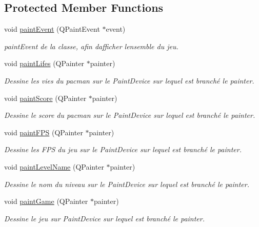 \subsection*{Protected Member Functions}
\begin{DoxyCompactItemize}
\item 
void \hyperlink{class_pacscreen_a2ad3be852db68118d6eb50e979b6e2e9}{paint\+Event} (Q\+Paint\+Event $\ast$event)
\begin{DoxyCompactList}\small\item\em paint\+Event de la classe, afin d\textquotesingle{}afficher l\textquotesingle{}ensemble du jeu. \end{DoxyCompactList}\item 
void \hyperlink{class_pacscreen_aafb0eadb554235b7a777ec9caa61be3d}{paint\+Lifes} (Q\+Painter $\ast$painter)
\begin{DoxyCompactList}\small\item\em Dessine les vies du pacman sur le Paint\+Device sur lequel est branché le painter. \end{DoxyCompactList}\item 
void \hyperlink{class_pacscreen_a458fdc2040c60b27ca03ce936c94358a}{paint\+Score} (Q\+Painter $\ast$painter)
\begin{DoxyCompactList}\small\item\em Dessine le score du pacman sur le Paint\+Device sur lequel est branché le painter. \end{DoxyCompactList}\item 
void \hyperlink{class_pacscreen_afd28b9d528ac6bf79eaff0668eb71175}{paint\+F\+P\+S} (Q\+Painter $\ast$painter)
\begin{DoxyCompactList}\small\item\em Dessine les F\+P\+S du jeu sur le Paint\+Device sur lequel est branché le painter. \end{DoxyCompactList}\item 
void \hyperlink{class_pacscreen_a31ce0c981b27c21501d0fd49a79abe5f}{paint\+Level\+Name} (Q\+Painter $\ast$painter)
\begin{DoxyCompactList}\small\item\em Dessine le nom du niveau sur le Paint\+Device sur lequel est branché le painter. \end{DoxyCompactList}\item 
void \hyperlink{class_pacscreen_a7cf6fe4c2b68c588de61b5111f29d7de}{paint\+Game} (Q\+Painter $\ast$painter)
\begin{DoxyCompactList}\small\item\em Dessine le jeu sur Paint\+Device sur lequel est branché le painter. \end{DoxyCompactList}\item 

\end{DoxyCompactItemize}
